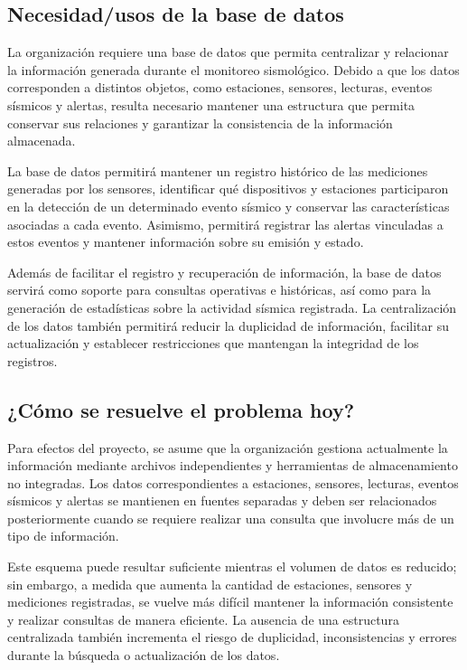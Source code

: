 \documentclass[12pt,a4paper]{article}
\begin{document}

\subsection{Necesidad/usos de la base de datos}
La organización requiere una base de datos que permita centralizar y relacionar la información generada durante el monitoreo sismológico. Debido a que los datos corresponden a distintos objetos, como estaciones, sensores, lecturas, eventos sísmicos y alertas, resulta necesario mantener una estructura que permita conservar sus relaciones y garantizar la consistencia de la información almacenada.

La base de datos permitirá mantener un registro histórico de las mediciones generadas por los sensores, identificar qué dispositivos y estaciones participaron en la detección de un determinado evento sísmico y conservar las características asociadas a cada evento. Asimismo, permitirá registrar las alertas vinculadas a estos eventos y mantener información sobre su emisión y estado.

Además de facilitar el registro y recuperación de información, la base de datos servirá como soporte para consultas operativas e históricas, así como para la generación de estadísticas sobre la actividad sísmica registrada. La centralización de los datos también permitirá reducir la duplicidad de información, facilitar su actualización y establecer restricciones que mantengan la integridad de los registros.

\subsection{¿Cómo se resuelve el problema hoy?}

Para efectos del proyecto, se asume que la organización gestiona actualmente la información mediante archivos independientes y herramientas de almacenamiento no integradas. Los datos correspondientes a estaciones, sensores, lecturas, eventos sísmicos y alertas se mantienen en fuentes separadas y deben ser relacionados posteriormente cuando se requiere realizar una consulta que involucre más de un tipo de información.

Este esquema puede resultar suficiente mientras el volumen de datos es reducido; sin embargo, a medida que aumenta la cantidad de estaciones, sensores y mediciones registradas, se vuelve más difícil mantener la información consistente y realizar consultas de manera eficiente. La ausencia de una estructura centralizada también incrementa el riesgo de duplicidad, inconsistencias y errores durante la búsqueda o actualización de los datos.
\end{document}
